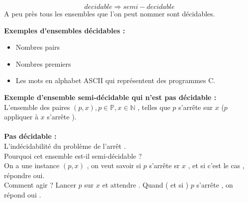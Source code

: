 \documentclass[base.tex]{subfiles}
\begin{document}
\[decidable\Rightarrow semi-decidable\]
A peu près tous les ensembles que l'on peut nommer sont décidables.

\textbf{Exemples d'ensembles décidables :}
\begin{itemize}
\item Nombres pairs
\item Nombres premiers
  \item Les mots en alphabet ASCII qui représentent des programmes C.
\end{itemize}

\textbf{Exemple d'ensemble semi-décidable qui n'est pas décidable :}\\
L'ensemble des paires $(p,x) , p \in \mathbb{P} , x \in \mathbb{N}$ , telles que $p$ s'arrête sur $x$ ($p$ appliquer à $x$ s'arrête ).\\
\\
\textbf{Pas décidable :}\\
L'indécidabilité du problème de l'arrêt .
\\
Pourquoi cet ensemble est-il semi-décidable ? \\
On a une instance $(p,x)$ , on veut savoir si $p$ s'arrête sr $x$ , et si c'est le cas , répondre oui.\\
Comment agir ? Lancer $p$ sur $x$ et attendre . Quand ( et si ) $p$ s'arrête , on répond oui .
\end{document}

